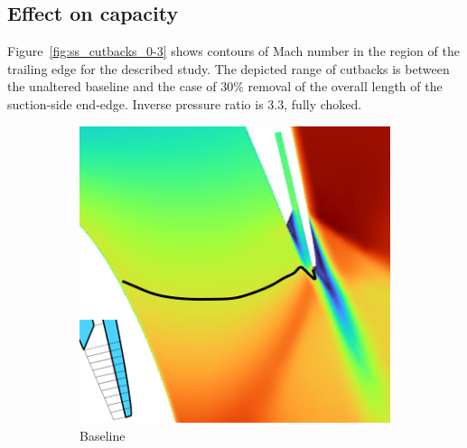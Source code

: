 \documentclass[a4paper, 11pt, oneside]{report}
\begin{document}
\subsection{Effect on capacity}

Figure~\ref{fig:ss_cutbacks_0-3} shows contours of Mach number in the region of the trailing edge for the described study. The depicted range of cutbacks is between the unaltered baseline and the case of $30\%$ removal of the overall length of the suction-side end-edge. Inverse pressure ratio is $3.3$, fully choked.

\begin{figure}[H]
	\centering
	\begin{subfigure}{.42\textwidth}
		\centering
		\includegraphics[width=\linewidth]{figs/ss_cutbacks_m1_lines_0.png}
		\caption{Baseline}
		\vspace{0.018\textheight}
	\end{subfigure}
	\hspace{0.05\textwidth}
	\begin{subfigure}{.42\textwidth}
		\centering

\end{subfigure}
\end{figure}
\end{document}
